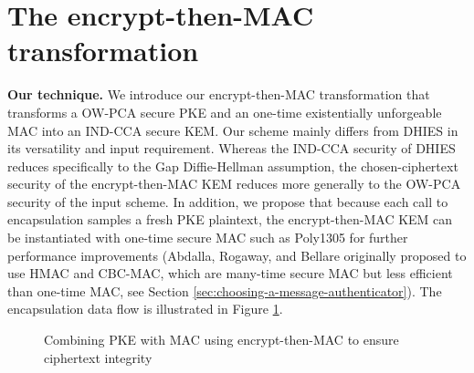 \documentclass[runningheads]{llncs}
\newcommand{\mac}{\texttt{MAC}}
\newcommand{\pk}{\texttt{pk}}
\newcommand{\leftsample}{\stackrel{\$}{\leftarrow}}
\begin{document}
\section{The encrypt-then-MAC transformation}\label{sec:main-results}
\noindent\textbf{Our technique.} We introduce our encrypt-then-MAC transformation that transforms a OW-PCA secure PKE and an one-time existentially unforgeable MAC into an IND-CCA secure KEM. Our scheme mainly differs from DHIES in its versatility and input requirement. Whereas the IND-CCA security of DHIES reduces specifically to the Gap Diffie-Hellman assumption, the chosen-ciphertext security of the encrypt-then-MAC KEM reduces more generally to the OW-PCA security \cite{DBLP:conf/ctrsa/OkamotoP01} of the input scheme. In addition, we propose that because each call to encapsulation samples a fresh PKE plaintext, the encrypt-then-MAC KEM can be instantiated with one-time secure MAC such as Poly1305 for further performance improvements (Abdalla, Rogaway, and Bellare originally proposed to use HMAC and CBC-MAC, which are many-time secure MAC but less efficient than one-time MAC, see Section \ref{sec:choosing-a-message-authenticator}). The encapsulation data flow is illustrated in Figure \ref{fig:etm-diagram}.

\begin{figure}[h]
    \centering

    \caption{Combining PKE with MAC using encrypt-then-MAC to ensure ciphertext integrity}\label{fig:etm-diagram}
\end{figure}
\end{document}
